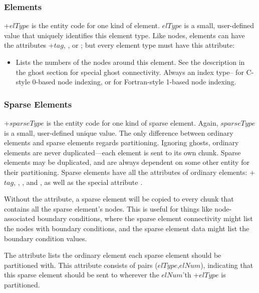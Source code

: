 \subsubsection{Elements}
+$elType$ is the entity code for one kind of element.
$elType$ is a small, user-defined value that uniquely identifies 
this element type.  Like nodes, elements can have the attributes
+$tag$, , or ;
but every element type must have this attribute:

\begin{itemize}
\item {} Lists the numbers of the nodes around this element. 
    See the description in the ghost section for special ghost connectivity.
    Always an index type-- for C-style 0-based node indexing,
    or  for Fortran-style 1-based node indexing.
\end{itemize}


\subsubsection{Sparse Elements}
+$sparseType$ is the entity code for one kind of sparse element.
Again, $sparseType$ is a small, user-defined unique value.
The only difference between ordinary elements and sparse elements 
regards partitioning.  Ignoring ghosts, ordinary elements are never duplicated---each
element is sent to its own chunk.  Sparse elements may be duplicated,
and are always dependent on some other entity for their partitioning.
Sparse elements have all the attributes of ordinary elements:
+$tag$, , ,
and , as well as the special attribute .

Without the  attribute, a sparse element will 
be copied to every chunk that contains all the sparse element's nodes.  
This is useful for things like node-associated boundary conditions, 
where the sparse element connectivity might list the nodes with boundary
conditions, and the sparse element data might list the boundary condition values.

The  attribute lists the ordinary element each 
sparse element should be partitioned with.  This attribute consists of 
pairs ($elType$,$elNum$), indicating that this sparse element
should be sent to wherever the $elNum$'th +$elType$ 
is partitioned.


